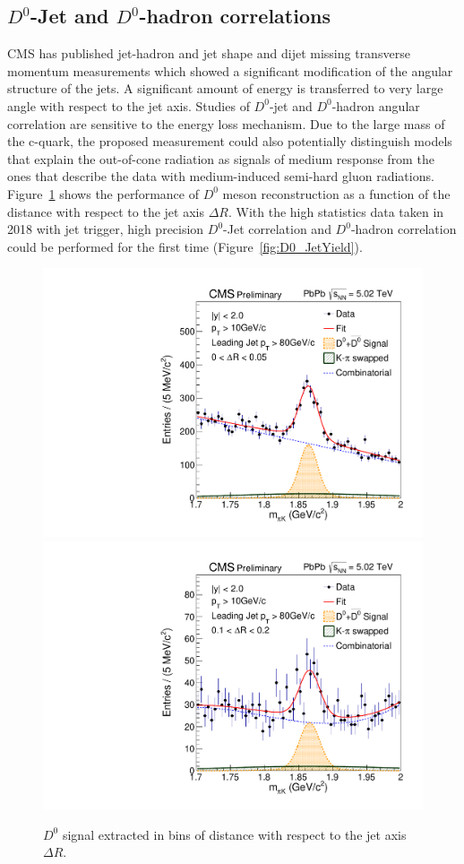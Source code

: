 \subsection{$D^0$-Jet and $D^0$-hadron correlations}

CMS has published jet-hadron and jet shape and dijet missing transverse momentum measurements which showed a significant modification of the angular structure of the jets. A significant amount of energy is transferred to very large angle with respect to the jet axis. Studies of $D^0$-jet and $D^0$-hadron angular correlation are sensitive to the energy loss mechanism. Due to the large mass of the c-quark, the proposed measurement could also potentially distinguish models that explain the out-of-cone radiation as signals of medium response from the ones that describe the data with medium-induced semi-hard gluon radiations. Figure~\ref{fig:D0_Jet} shows the performance of $D^0$ meson reconstruction as a function of the distance with respect to the jet axis $\Delta R$. With the high statistics data taken in 2018 with jet trigger, high precision $D^0$-Jet correlation and $D^0$-hadron correlation could be performed for the first time (Figure~\ref{fig:D0_JetYield}).

\begin{figure}[!ht]
\begin{center}
\includegraphics[width=.49\textwidth]{DJetPlots/fhHistoMass_R0.pdf}
\includegraphics[width=.49\textwidth]{DJetPlots/fhHistoMass_R2.pdf}
\caption{$D^0$ signal extracted in bins of distance with respect to the jet axis $\Delta R$. }
\label{fig:D0_Jet}
\end{center}
\end{figure}

